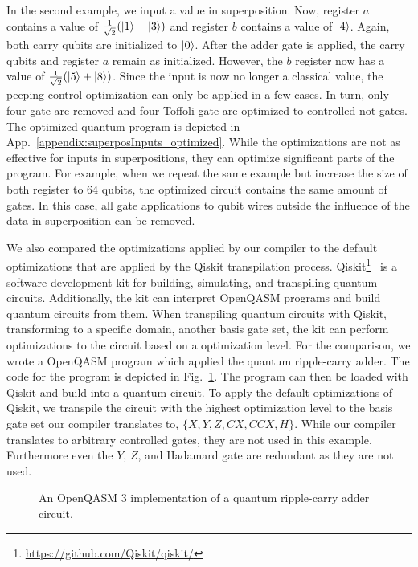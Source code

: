 In the second example, we input a value in superposition. Now, register $a$ contains a value of $\frac{1}{\sqrt{2}} (\ket{1} + \ket{3})$ and register $b$ contains a value of $\ket{4}$. Again, both carry qubits are initialized to $\ket{0}$. After the adder gate is applied, the carry qubits and register $a$ remain as initialized. However, the $b$ register now has a value of $\frac{1}{\sqrt{2}} (\ket{5} + \ket{8})$.
Since the input is now no longer a classical value, the peeping control optimization can only be applied in a few cases. In turn, only four gate are removed and four Toffoli gate are optimized to controlled-not gates.
The optimized quantum program is depicted in App.~\ref{appendix:superposInputs_optimized}. While the optimizations are not as effective for inputs in superpositions, they can optimize significant parts of the program. For example, when we repeat the same example but increase the size of both register to $64$ qubits, the optimized circuit contains the same amount of gates. In this case, all gate applications to qubit wires outside the influence of the data in superposition can be removed.

We also compared the optimizations applied by our compiler to the default optimizations that are applied by the Qiskit transpilation process. Qiskit\footnote{\url{https://github.com/Qiskit/qiskit/}}~\cite{JTK*24} is a software development kit for building, simulating, and transpiling quantum circuits. Additionally, the kit can interpret OpenQASM programs and build quantum circuits from them. When transpiling quantum circuits with Qiskit, \ie transforming to a specific domain, \eg another basis gate set, the kit can perform optimizations to the circuit based on a optimization level. For the comparison, we wrote a OpenQASM program which applied the quantum ripple-carry adder. The code for the program is depicted in Fig.~\ref*{fig:eval_adder_qasm}. The program can then be loaded with Qiskit and build into a quantum circuit. To apply the default optimizations of Qiskit, we transpile the circuit with the highest optimization level to the basis gate set our compiler translates to, \ie $\{X, Y, Z, CX, CCX, H\}$. While our compiler translates to arbitrary controlled gates, they are not used in this example. Furthermore even the $Y$, $Z$, and Hadamard gate are redundant as they are not used.

\begin{figure}[htp]
    \centering     
    
    \caption{An OpenQASM 3 implementation of a quantum ripple-carry adder circuit.}
    \label{fig:eval_adder_qasm}
\end{figure}

